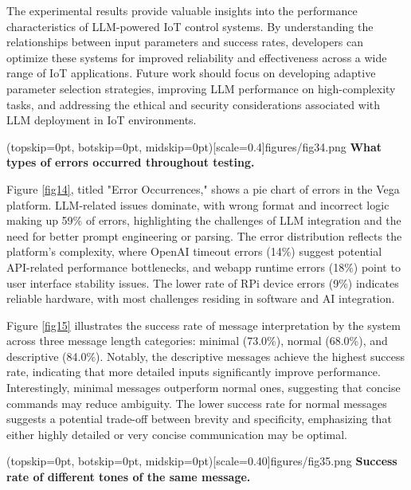 \documentclass{ieeeaccess}
\begin{document}
The experimental results provide valuable insights into the performance characteristics of LLM-powered IoT control systems. By understanding the relationships between input parameters and success rates, developers can optimize these systems for improved reliability and effectiveness across a wide range of IoT applications. Future work should focus on developing adaptive parameter selection strategies, improving LLM performance on high-complexity tasks, and addressing the ethical and security considerations associated with LLM deployment in IoT environments.



\Figure[t!](topskip=0pt, botskip=0pt,
midskip=0pt)[scale=0.4]{{figures/fig34.png}}
{ \textbf{What types of errors occurred throughout testing.}\label{fig14}}


Figure \ref{fig14}, titled "Error Occurrences," shows a pie chart of errors in the Vega platform. LLM-related issues dominate, with wrong format and incorrect logic making up 59\% of errors, highlighting the challenges of LLM integration and the need for better prompt engineering or parsing. The error distribution reflects the platform's complexity, where OpenAI timeout errors (14\%) suggest potential API-related performance bottlenecks, and webapp runtime errors (18\%) point to user interface stability issues. The lower rate of RPi device errors (9\%) indicates reliable hardware, with most challenges residing in software and AI integration.


Figure \ref{fig15} illustrates the success rate of message interpretation by the system across three message length categories: minimal (73.0\%), normal (68.0\%), and descriptive (84.0\%). Notably, the descriptive messages achieve the highest success rate, indicating that more detailed inputs significantly improve performance. Interestingly, minimal messages outperform normal ones, suggesting that concise commands may reduce ambiguity. The lower success rate for normal messages suggests a potential trade-off between brevity and specificity, emphasizing that either highly detailed or very concise communication may be optimal. 

\Figure[t!](topskip=0pt, botskip=0pt,
midskip=0pt)[scale=0.40]{{figures/fig35.png}}
{ \textbf{Success rate of different tones of the same message.}\label{fig15}}
\end{document}
